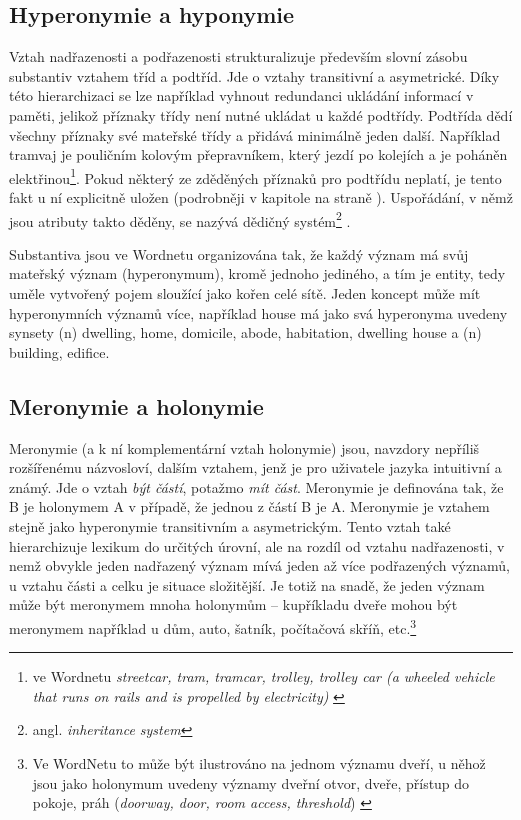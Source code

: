 \documentclass[a4paper, 11pt, oneside]{book}
\newcommand{\itNameRef}[1]{\textit{\nameref{#1}}}
\newcommand\ex{\textsf}
\begin{document}

				
				\subsection{Hyperonymie a hyponymie}
				\label{cha:hyperohyp}

					Vztah nadřazenosti a podřazenosti strukturalizuje především slovní zásobu substantiv vztahem tříd a podtříd. Jde o vztahy transitivní a asymetrické. \parencite{miller1990introduction} Díky této hierarchizaci se lze například vyhnout redundanci ukládání informací v paměti, jelikož příznaky třídy není nutné ukládat u každé podtřídy. Podtřída dědí všechny příznaky své mateřské třídy a přidává minimálně jeden další. Například \ex{tramvaj} je \ex{pouličním kolovým přepravníkem, který jezdí po kolejích a je poháněn elektřinou}\footnote{ve Wordnetu \textit{streetcar, tram, tramcar, trolley, trolley car (a wheeled vehicle that runs on rails and is propelled by electricity)} \parencite{princetonWN}}. Pokud některý ze zděděných příznaků pro podtřídu neplatí, je tento fakt u ní explicitně uložen (podrobněji v kapitole \itNameRef{cha:psycho} na straně \pageref{cha:psycho}). Uspořádání, v němž jsou atributy takto děděny, se nazývá dědičný systém\footnote{angl. \textit{inheritance system}} \parencite{touretzky1986mathematics}.

					Substantiva jsou ve Wordnetu organizována tak, že každý význam má svůj mateřský význam (hyperonymum), kromě jednoho jediného, a tím je \ex{entity}, tedy uměle vytvořený pojem sloužící jako kořen celé sítě. Jeden koncept může mít hyperonymních významů více, například \ex{house} má jako svá hyperonyma uvedeny synsety \ex{(n) dwelling, home, domicile, abode, habitation, dwelling house} a \ex{(n) building, edifice}.

				\subsection{Meronymie a holonymie}

					Meronymie (a k ní komplementární vztah holonymie) jsou, navzdory nepříliš rozšířenému názvosloví, dalším vztahem, jenž je pro uživatele jazyka intuitivní a známý. Jde o vztah \textit{být částí}, potažmo \textit{mít část}. Meronymie je definována tak, že B je holonymem A v případě, že jednou z částí B je A. Meronymie je vztahem stejně jako hyperonymie transitivním a asymetrickým. \parencite{cruse1986lexical} Tento vztah také hierarchizuje lexikum do určitých úrovní, ale na rozdíl od vztahu nadřazenosti, v nemž obvykle jeden nadřazený význam mívá jeden až více podřazených významů, u vztahu části a celku je situace složitější. Je totiž na snadě, že jeden význam může být meronymem mnoha holonymům -- kupříkladu \ex{dveře} mohou být meronymem například u \ex{dům}, \ex{auto}, \ex{šatník}, \ex{počítačová skříň}, etc.\footnote{Ve WordNetu to může být ilustrováno na jednom významu \ex{dveří}, u něhož jsou jako holonymum uvedeny významy \ex{dveřní otvor, dveře, přístup do pokoje, práh} (\textit{doorway, door, room access, threshold}) \parencite{princetonWN}}
\end{document}
